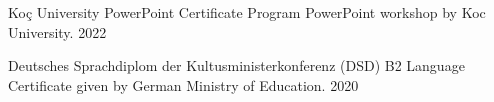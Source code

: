 
\begin{cvhonors}

  \cvhonor
    {Koç University PowerPoint Certificate Program}
    {PowerPoint workshop by Koc University.}
    {}
    {2022}

  \cvhonor
    {Deutsches Sprachdiplom der Kultusministerkonferenz (DSD) B2}
    {Language Certificate given by German Ministry of Education.}
    {}
    {2020}

\end{cvhonors}
